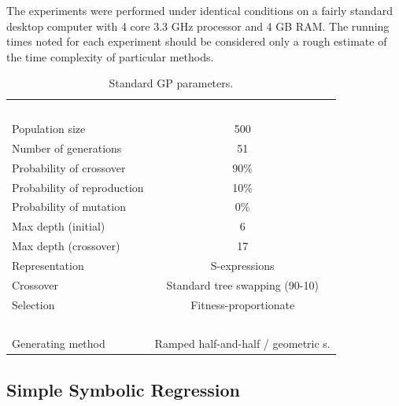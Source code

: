 \documentclass[conference]{IEEEtran}
\begin{document}
The experiments were performed under identical conditions on a fairly standard
desktop computer with 4 core 3.3 GHz processor and 4 GB RAM. The running times noted for each experiment should be considered only a rough estimate of the time complexity of particular methods.   

\begin{table}[!t]
\caption{Standard GP parameters.}
\centering
\begin{tabular}{|l|c|}
\hline
~&~\\
Population size             & 500\\
Number of generations       & 51\\
Probability of crossover    & 90\%\\
Probability of reproduction & 10\%\\
Probability of mutation     & 0\%\\
Max depth (initial)         & 6\\
Max depth (crossover)       & 17\\
Representation              & S-expressions\\
Crossover                   & Standard tree swapping (90-10)\\
Selection                   & Fitness-proportionate\\
~&~\\
\hline
Generating method           & Ramped half-and-half / geometric s.\\
\hline
\end{tabular}
\end{table}

\subsection{Simple Symbolic Regression}
\end{document}
